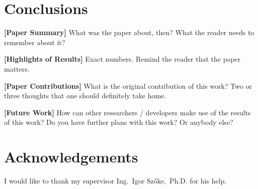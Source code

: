 \documentclass{ExcelAtFIT}
\begin{document}
\section{Conclusions}
\label{sec:Conclusions}

\textbf{[Paper Summary]} What was the paper about, then? What the reader needs to remember about it?

\textbf{[Highlights of Results]} Exact numbers. Remind the reader that the paper matters.


\textbf{[Paper Contributions]} What is the original contribution of this work? Two or three thoughts that one should definitely take home.


\textbf{[Future Work]} How can other researchers / developers make use of the results of this work?  Do you have further plans with this work? Or anybody else?


\section*{Acknowledgements}
I would like to thank my supervisor Ing.~Igor Szőke,~Ph.D. for his help.





\end{document}
